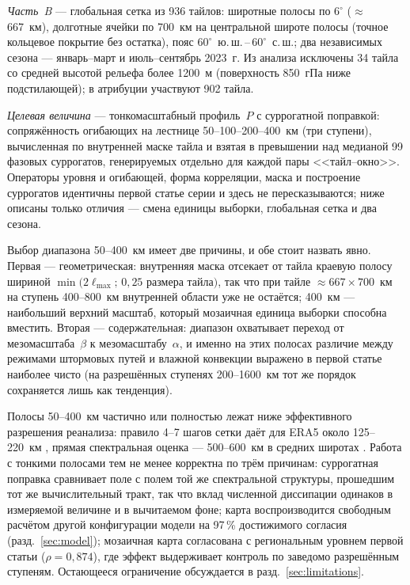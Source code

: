 \documentclass[11pt,a4paper]{article}
\begin{document}
\emph{Часть~B} --- глобальная сетка из 936 тайлов: широтные полосы по $6^\circ$ ($\approx$667~км), долготные ячейки по 700~км на центральной широте полосы (точное кольцевое покрытие без остатка), пояс $60^\circ$~ю.\,ш.\,--\,$60^\circ$~с.\,ш.; два независимых сезона --- январь--март и июль--сентябрь 2023~г. Из анализа исключены 34 тайла со средней высотой рельефа более 1200~м (поверхность 850~гПа ниже подстилающей); в атрибуции участвуют 902 тайла.

\emph{Целевая величина} --- тонкомасштабный профиль~$P$ с суррогатной поправкой: сопряжённость огибающих на лестнице 50--100--200--400~км (три ступени), вычисленная по внутренней маске тайла и взятая в превышении над медианой 99 фазовых суррогатов, генерируемых отдельно для каждой пары <<тайл--окно>>. Операторы уровня и огибающей, форма корреляции, маска и построение суррогатов идентичны первой статье серии и здесь не пересказываются; ниже описаны только отличия --- смена единицы выборки, глобальная сетка и два сезона.

Выбор диапазона 50--400~км имеет две причины, и обе стоит назвать явно. Первая --- геометрическая: внутренняя маска отсекает от тайла краевую полосу шириной $\min(2\ell_{\max};\,0{,}25$ размера тайла$)$, так что при тайле $\approx667\times700$~км на ступень 400--800~км внутренней области уже не остаётся; 400~км --- наибольший верхний масштаб, который мозаичная единица выборки способна вместить. Вторая --- содержательная: диапазон охватывает переход от мезомасштаба~$\beta$ к мезомасштабу~$\alpha$, и именно на этих полосах различие между режимами штормовых путей и влажной конвекции выражено в первой статье наиболее чисто (на разрешённых ступенях 200--1600~км тот же порядок сохраняется лишь как тенденция).

Полосы 50--400~км частично или полностью лежат ниже эффективного разрешения реанализа: правило 4--7 шагов сетки даёт для ERA5 около 125--220~км \cite{Skamarock2004}, прямая спектральная оценка --- 500--600~км в средних широтах \cite{Bolgiani2022}. Работа с тонкими полосами тем не менее корректна по трём причинам: суррогатная поправка сравнивает поле с полем той же спектральной структуры, прошедшим тот же вычислительный тракт, так что вклад численной диссипации одинаков в измеряемой величине и в вычитаемом фоне; карта воспроизводится свободным расчётом другой конфигурации модели на 97\,\% достижимого согласия (разд.~\ref{sec:model}); мозаичная карта согласована с региональным уровнем первой статьи ($\rho=0{,}874$), где эффект выдерживает контроль по заведомо разрешённым ступеням. Остающееся ограничение обсуждается в разд.~\ref{sec:limitations}.
\end{document}
